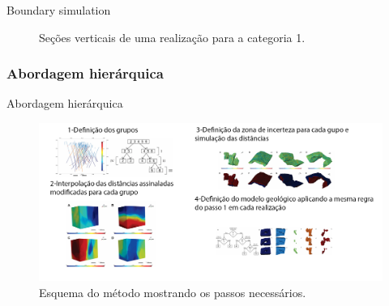 \documentclass[aspectratio=169]{beamer}
\begin{document}
\begin{frame}{Boundary simulation}
	\begin{figure}[H]
		\caption{Seções verticais de uma realização para a categoria 1.} 
		\label{cpar_real}
	\end{figure}
\end{frame}

\subsubsection{Abordagem hierárquica}

\begin{frame}{Abordagem hierárquica}
	\begin{figure}[H]
		\caption{\label{hier_ex}Esquema do método mostrando os passos necessários.}
		\begin{center}
			\includegraphics[width=\textwidth]{capitulo_2/hier_example.png}
		\end{center}
	\end{figure}
\end{frame}
\end{document}
